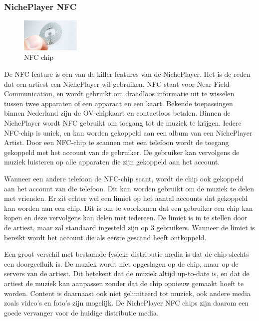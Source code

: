 \subsubsection*{NichePlayer NFC}
\begin{figure}
  \centering
  \includegraphics[width=0.25\textwidth]{assets/uitvoering/NFC_chips.jpg}
  \caption{NFC chip}
  \label{fig:uitvoering:NFC_chip}
\end{figure}
De NFC-feature is een van de killer-features van de NichePlayer. Het is de reden dat een artiest een NichePlayer wil gebruiken. NFC staat voor Near Field Communication, en wordt gebruikt om draadloos informatie uit te wisselen tussen twee apparaten of een apparaat en een kaart. Bekende toepassingen binnen Nederland zijn de OV-chipkaart en contactloos betalen. Binnen de NichePlayer wordt NFC gebruikt om toegang tot de muziek te krijgen. Iedere NFC-chip is uniek, en kan worden gekoppeld aan een album van een NichePlayer Artist. Door een NFC-chip te scannen met een telefoon wordt de toegang gekoppeld met het account van de gebruiker. De gebruiker kan vervolgens de muziek luisteren op alle apparaten die zijn gekoppeld aan het account.

Wanneer een andere telefoon de NFC-chip scant, wordt de chip ook gekoppeld aan het account van die telefoon. Dit kan worden gebruikt om de muziek te delen met vrienden. Er zit echter wel een limiet op het aantal accounts dat gekoppeld kan worden aan een chip. Dit is om te voorkomen dat een gebruiker een chip kan kopen en deze vervolgens kan delen met iedereen. De limiet is in te stellen door de artiest, maar zal standaard ingesteld zijn op 3 gebruikers. Wanneer de limiet is bereikt wordt het account die als eerste gescand heeft ontkoppeld.

Een groot verschil met bestaande fysieke distributie media is dat de chip slechts een doorgeefluik is. De muziek wordt niet opgeslagen op de chip, maar op de servers van de artiest. Dit betekent dat de muziek altijd up-to-date is, en dat de artiest de muziek kan aanpassen zonder dat de chip opnieuw gemaakt hoeft te worden. Content is daarnaast ook niet gelimiteerd tot muziek, ook andere media zoals video's en foto's zijn mogelijk. De NichePlayer NFC chips zijn daarom een goede vervanger voor de huidige distributie media.

